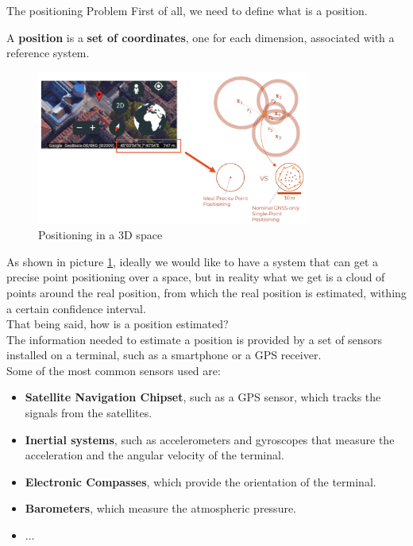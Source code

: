   \begin{section}{The positioning Problem}
    First of all, we need to define what is a position.\\
    \begin{boxH}
      A \textbf{position} is a \textbf{set of coordinates}, one for each
      dimension, associated with a reference system.
    \end{boxH}
    \begin{figure}[h]
      \centering
      \includegraphics[width=0.8\textwidth]{img/wireless/GNSS position.png}
      \caption{Positioning in a 3D space}
      \label{fig:GNSS position}
    \end{figure}
    As shown in picture \ref{fig:GNSS position}, ideally we would like to have a system that can
    get a precise point positioning over a space, but in reality what we get is a cloud of points
    around the real position, from which the real position is estimated, withing a certain confidence
    interval.\\

    That being said, how is a position estimated?\\
    The information needed to estimate a position is provided by a set of sensors installed on 
    a terminal, such as a smartphone or a GPS receiver.\\
    Some of the most common sensors used are:
    \begin{itemize}
      \item \textbf{Satellite Navigation Chipset}, such as a GPS sensor, which tracks the signals
        from the satellites.
      \item \textbf{Inertial systems}, such as accelerometers and gyroscopes that measure the 
        acceleration and the angular velocity of the terminal.
      \item \textbf{Electronic Compasses}, which provide the orientation of the terminal.
      \item \textbf{Barometers}, which measure the atmospheric pressure.
      \item $\dots$
    \end{itemize}


\end{section}

